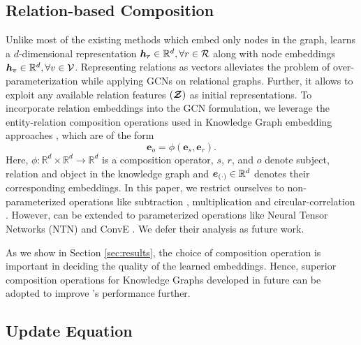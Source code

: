 \documentclass{article} \usepackage{iclr2020_conference,times}
\begin{document}
\subsection{Relation-based Composition}
\label{sec:details_relation}
Unlike most of the existing methods which embed only nodes in the graph, \method{} learns a $d$-dimensional representation $\bm{h}_r \in \mathbb{R}^{d}, \forall r \in \mathcal{R}$ along with node embeddings $\bm{h}_v \in \mathbb{R}^{d}, \forall v \in \mathcal{V}$. Representing relations as vectors alleviates the problem of over-parameterization while applying GCNs on relational graphs. Further, it allows \method{} to exploit any available relation features $(\bm{\mathcal{Z}})$ as initial representations. To incorporate relation embeddings into the GCN formulation, we leverage the entity-relation composition operations used in Knowledge Graph embedding approaches \citep{transe,survey2016nickel}, which are of the form
\[
\bm{e}_o = \phi(\bm{e}_s, \bm{e}_r).
\]
Here, $\phi:\mathbb{R}^{d} \times \mathbb{R}^{d} \to \mathbb{R}^{d}$ is a composition operator, $s$, $r$, and $o$ denote subject, relation and object in the knowledge graph and $\bm{e}_{(\cdot)} \in \mathbb{R}^{d}$ denotes their corresponding embeddings. In this paper, we restrict ourselves to non-parameterized operations like subtraction \citep{transe}, multiplication \citep{distmult} and circular-correlation \citep{hole}. However, \method{} can be extended to parameterized operations like Neural Tensor Networks (NTN) \citep{ntn_kg} and ConvE \citep{conve}. We defer their analysis as future work.

As we show in Section \ref{sec:results}, the choice of composition operation is important in deciding the quality of the learned embeddings. Hence, superior composition operations for Knowledge Graphs developed in future can be adopted to improve \method's performance further.

\subsection{\method{} Update Equation}
\end{document}
